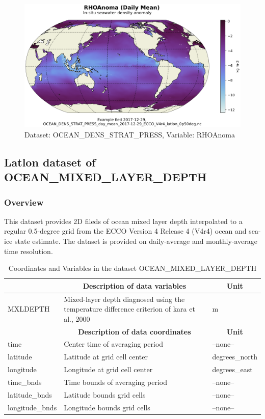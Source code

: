 \begin{figure}[H]
\centering
\includegraphics[scale=0.55]{../images/plots/latlon_plots/Ocean_Density_Stratification_and_Hydrostatic_Pressure/RHOAnoma.png}
\caption{Dataset: OCEAN\_DENS\_STRAT\_PRESS, Variable: RHOAnoma}
\label{tab:table-OCEAN_DENS_STRAT_PRESS_RHOAnoma-Plot}
\end{figure}
\subsection{Latlon dataset of OCEAN\_MIXED\_LAYER\_DEPTH}
\newp
\subsubsection{Overview}
This dataset provides 2D fileds of ocean mixed layer depth interpolated to a regular 0.5-degree grid from the ECCO Version 4 Release 4 (V4r4) ocean and sea-ice state estimate. The dataset is provided on daily-average and monthly-average time resolution. 
\begin{longtable}{|m{}|m{}|m{}|}
\caption{Coordinates and Variables in the dataset OCEAN\_MIXED\_LAYER\_DEPTH}
\label{tab:table-OCEAN_MIXED_LAYER_DEPTH-fields} \\ 
\hline \endhead \hline \endfoot
\rowcolor{lightgray} \multicolumn{1}{|c|}{\textbf{Variables}} & \multicolumn{1}{|c|}{\textbf{Description of data variables}} &  \multicolumn{1}{|c|}{\textbf{Unit}}\\ \hline
MXLDEPTH &Mixed-layer depth diagnosed using the temperature difference criterion of kara et al., 2000 &m  \\ \hline
\rowcolor{lightgray} \multicolumn{1}{|c|}{\textbf{Coordinates}} & \multicolumn{1}{|c|}{\textbf{Description of data coordinates}} &  \multicolumn{1}{|c|}{\textbf{Unit}}\\ \hline
time &Center time of averaging period &--none--  \\ \hline
latitude &Latitude at grid cell center &degrees\_north  \\ \hline
longitude &Longitude at grid cell center &degrees\_east  \\ \hline
time\_bnds &Time bounds of averaging period &--none--  \\ \hline
latitude\_bnds &Latitude bounds grid cells &--none--  \\ \hline
longitude\_bnds &Longitude bounds grid cells &--none--  \\ \hline
\end{longtable}

